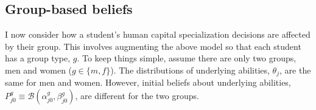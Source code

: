 \documentclass[10 pt]{article}
\newcommand{\pr}[1]{\left( #1 \right)}
\begin{document}
\subsection{Group-based beliefs}

I now consider how a student's human capital specialization decisions are affected by their group.
This involves augmenting the above model so that each student has a group type, $g$.
To keep things simple, assume there are only two groups, men and women ($g \in \{m, f\}$). 
The distributions of underlying abilities, $\theta_j$, are the same for men and women.
However, initial beliefs about underlying abilities, 
$P_{j0}^g \equiv \mathcal{B} \pr{\alpha_{j0}^g, \beta_{j0}^g}$, 
are different for the two groups.
\end{document}

